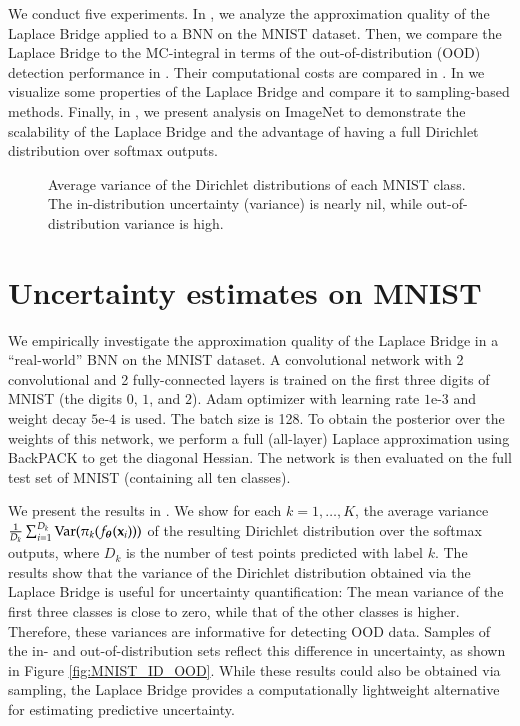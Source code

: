 
We conduct five experiments. In , we analyze the approximation quality of the Laplace Bridge applied to a BNN on the MNIST \cite{MNIST2010} dataset. Then, we compare the Laplace Bridge to the MC-integral in terms of the out-of-distribution (OOD) detection performance in . Their computational costs are compared in . In  we visualize some properties of the Laplace Bridge and compare it to sampling-based methods. Finally, in , we present analysis on ImageNet \cite{ImageNet2015} to demonstrate the scalability of the Laplace Bridge and the advantage of having a full Dirichlet distribution over softmax outputs.


\setlength{\figwidth}{0.8\textwidth}
\setlength{\figheight}{0.3\textheight}
\begin{figure}[t]
    \centering
    \scriptsize
    
    \captionsetup{skip=0pt}
    \caption{Average variance of the Dirichlet distributions of each MNIST class. The in-distribution uncertainty (variance) is nearly nil, while out-of-distribution variance is high.}
    \label{subfig:MNIST_uncertainty}
\end{figure}

\section{Uncertainty estimates on MNIST}
\label{subsec:exp1_MNIST}

We empirically investigate the approximation quality of the Laplace Bridge in a ``real-world'' BNN on the MNIST dataset. A convolutional network with 2 convolutional and 2 fully-connected layers is trained on the first three digits of MNIST (the digits $0$, $1$, and $2$).
Adam optimizer with learning rate $1$e-$3$ and weight decay $5$e-$4$ is used. The batch size is 128.
To obtain the posterior over the weights of this network, we perform a full (all-layer) Laplace approximation using BackPACK \citep{dangel2020backpack} to get the diagonal Hessian. The network is then evaluated on the full test set of MNIST (containing all ten classes).

We present the results in . We show for each $k = 1, \dots, K$, the average variance $\frac{1}{D_k} \sum_{i=1}^{D_k} \mathrm{Var}(\pi_k(f_{\boldsymbol{\theta}}(\mathbf{x}_i)))$ of the resulting Dirichlet distribution over the softmax outputs, where $D_k$ is the number of test points predicted with label $k$. The results show that the variance of the Dirichlet distribution obtained via the Laplace Bridge is useful for uncertainty quantification: The mean variance of the first three classes is close to zero, while that of the other classes is higher. Therefore, these variances are informative for detecting OOD data.
Samples of the in- and out-of-distribution sets reflect this difference in uncertainty, as shown in Figure \ref{fig:MNIST_ID_OOD}. While these results could also be obtained via sampling, the Laplace Bridge provides a computationally lightweight alternative for estimating predictive uncertainty.

